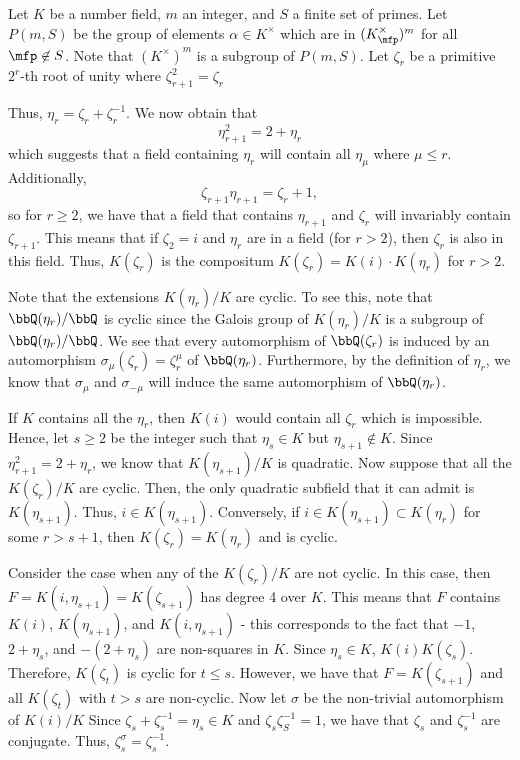 \documentclass[a4paper, 12pt,oneside,openany]{book}
\begin{document}

 Let $K$ be a number field, $m$ an integer, and $S$ a finite set of primes. Let $P(m, S)$ be the group of elements $\alpha \in K^\times$ which are in $(K_\mfp^\times)^m$ for all $\mfp \not\in S$. Note that $(K^\times)^m$ is a subgroup of $P(m, S)$. Let $\zeta_r$ be a primitive $2^r$-th root of unity where $\zeta_{r+1}^2=\zeta_r$

Thus, $\eta_r = \zeta_r+\zeta_r^{-1}$. We now obtain that $$\eta_{r+1}^2 = 2+\eta_r$$ which suggests that a field containing $\eta_r$ will contain all $\eta_\mu$ where $\mu \leq r$. Additionally, $$\zeta_{r+1}\eta_{r+1}=\zeta_r+1,$$ so for $r \geq 2$, we have that a field that contains $\eta_{r+1}$ and $\zeta_r$ will invariably contain $\zeta_{r+1}$. This means that if $\zeta_2=i$ and $\eta_r$ are in a field (for $r>2$), then $\zeta_r$ is also in this field. Thus, $K(\zeta_r)$ is the compositum $K(\zeta_r) = K(i) \cdot K(\eta_r)$ for $r>2$.

Note that the extensions $K(\eta_r)/K$ are cyclic. To see this, note that $\bbQ(\eta_r)/\bbQ$ is cyclic since the Galois group of $K(\eta_r)/K$ is a subgroup of $\bbQ(\eta_r)/\bbQ$. We see that every automorphism of $\bbQ(\zeta_r)$ is induced by an automorphism $\sigma_\mu(\zeta_r) = \zeta_r^\mu$ of $\bbQ(\eta_r)$. Furthermore, by the definition of $\eta_r$, we know that $\sigma_\mu$ and $\sigma_{-\mu}$ will induce the same automorphism of $\bbQ(\eta_r)$. 

If $K$ contains all the $\eta_r$, then $K(i)$ would contain all $\zeta_r$ which is impossible. Hence, let $s \geq 2$ be the integer such that $\eta_s \in K$ but $\eta_{s+1} \not\in K$. Since $\eta_{r+1}^2=2+\eta_r$, we know that $K(\eta_{s+1})/K$ is quadratic. Now suppose that all the $K(\zeta_r)/K$ are cyclic. Then, the only quadratic subfield that it can admit is $K(\eta_{s+1})$. Thus, $i \in K(\eta_{s+1})$. Conversely, if $i \in K(\eta_{s+1}) \subset K(\eta_r)$ for some $r>s+1$, then $K(\zeta_r)=K(\eta_r)$ and is cyclic. 

Consider the case when any of the $K(\zeta_r)/K$ are not cyclic. In this case, then $F = K(i, \eta_{s+1})=K(\zeta_{s+1})$ has degree 4 over $K$. This means that $F$ contains $K(i)$, $K(\eta_{s+1})$, and $K(i, \eta_{s+1})$ - this corresponds to the fact that $-1$, $2+\eta_s$, and $-(2+\eta_s)$ are non-squares in $K$. Since $\eta_s \in K$, $K(i)K(\zeta_s)$. Therefore, $K(\zeta_t)$ is cyclic for $t \leq s$. However, we have that $F=K(\zeta_{s+1})$ and all $K(\zeta_t)$ with $t>s$ are non-cyclic. Now let $\sigma$ be the non-trivial automorphism of $K(i)/K$ Since $\zeta_s+\zeta_s^{-1}=\eta_s \in K$ and $\zeta_s\zeta_S^{-1} = 1$, we have that $\zeta_s$ and $\zeta_s^{-1}$ are conjugate. Thus, $\zeta_s^\sigma = \zeta_s^{-1}$.
\end{document}
